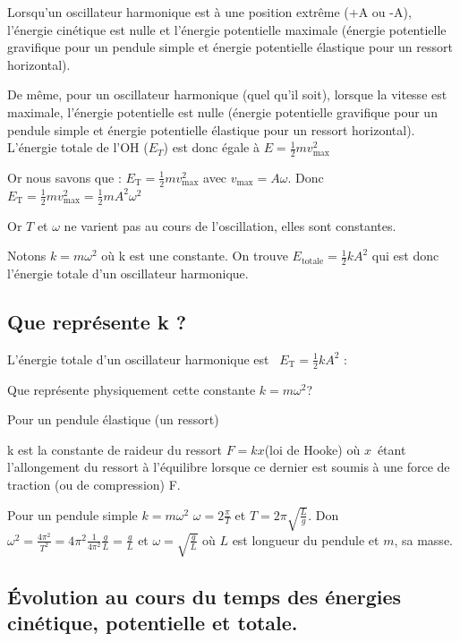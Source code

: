 \begin{multicols}{2}
Lorsqu’un oscillateur harmonique est à une position extrême (+A ou  -A), l’énergie cinétique est nulle et l’énergie
potentielle maximale (énergie potentielle gravifique pour un pendule simple et énergie potentielle élastique pour un
ressort horizontal).

De même, pour un oscillateur harmonique (quel qu’il soit), lorsque la vitesse est maximale, l’énergie potentielle est
nulle (énergie potentielle gravifique pour un pendule simple et énergie potentielle élastique pour un ressort
horizontal). L’énergie totale de l’OH ($E_T$) est donc égale à $E=\frac{1}{2}mv_{\text{max}}^2$   

Or nous savons que  :  $E_{\text{T}}=\frac{1}{2}m v_{\text{max}}^2$  avec   $v_{\text{max}}=A\omega $. Donc 
$E_{\text{T}}=\frac{1}{2}mv_{\text{max}}^2=\frac{1}{2}mA^2\omega ^2$

Or  $T$  et  $\omega $  ne varient pas au cours de l’oscillation, elles sont constantes.

Notons $k=m\omega ^2$ où k est une constante. On trouve $E_{\text{totale}}=\frac{1}{2}kA^2$ 
qui est donc l’énergie totale d’un oscillateur harmonique. 


\subsection{Que représente k ? }
L’énergie totale d’un oscillateur harmonique est~ $E_{\text{T}}=\frac 1 2kA^2$ : 

Que représente physiquement cette constante  $k=m\omega ^2$?

Pour un pendule élastique (un ressort)

k est la constante de raideur du ressort  $F=kx$(loi de Hooke) où  $x$~étant l’allongement du ressort à l’équilibre
lorsque ce dernier est soumis à une force de traction (ou de compression) F.

Pour un pendule simple $k=m\omega ^2$  $\omega =2\frac{\pi } T$ et  $T=2\pi \sqrt{\frac L g}$. Don $\omega
^2=\frac{4\pi ^2}{T^2}=4\pi ^2\frac 1{4\pi ^2}\frac g L=\frac g L$
et  $\omega=\sqrt{\frac{g}{L}}$  où  $L$ est longueur du pendule et  $m$, sa masse.

\subsection[Évolution au cours du temps des énergies cinétique, potentielle et totale. ]{Évolution au cours du temps des
énergies cinétique, potentielle et totale. }
\begin{center}
\begin{minipage}{8.89cm}



\end{minipage}
\end{center}
\end{multicols}

